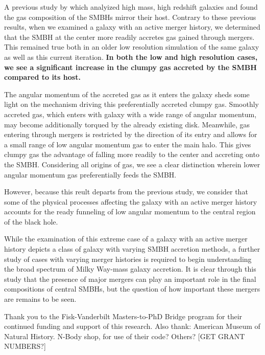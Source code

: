 \documentclass[manuscript]{aastex}
\begin{document}
A previous study by \cite{Bellovary2013} which analyized high mass, high redshift galaxies and found the gas composition of the SMBHs mirror their host. Contrary to these previous results, when we examined a galaxy with an active merger history, we determined that the SMBH at the center more readily accretes gas gained through mergers. This remained true both in an older low resolution simulation of the same galaxy as well as this current iteration. \textbf{In both the low and high resolution cases, we see a significant increase in the clumpy gas accreted by the SMBH compared to its host.} 

The angular momentum of the accreted gas as it enters the galaxy sheds some light on the mechanism driving this preferentially accreted clumpy gas. Smoothly accreted gas, which enters with galaxy with a wide range of angular momentum, may become additionally torqued by the already existing disk. Meanwhile, gas entering through mergers is restricted by the direction of its entry and allows for a small range of low angular momentum gas to enter the main halo. This gives clumpy gas the advantage of falling more readily to the center and accreting onto the SMBH. Considering all origins of gas, we see a clear distinction wherein lower angular momentum gas preferentially feeds the SMBH.

However, because this reult departs from the previous study, we consider that some of the physical processes affecting the galaxy with an active merger history accounts for the ready funneling of low angular momentum to the central region of the black hole. 

While the examination of this extreme case of a galaxy with an active merger history depicts a class of galaxy with varying SMBH accretion methods, a further study of cases with varying merger histories is required to begin understanding the broad spectrum of Milky Way-mass galaxy accretion. It is clear through this study that the presence of major mergers can play an important role in the final compositions of central SMBHs, but the question of how important these mergers are remains to be seen.



\acknowledgments
Thank you to the Fisk-Vanderbilt Masters-to-PhD Bridge program for their continued funding and support of this research.
Also thank: American Museum of Natural History. N-Body shop, for use of their code? Others? [GET GRANT NUMBERS?]
\end{document}
